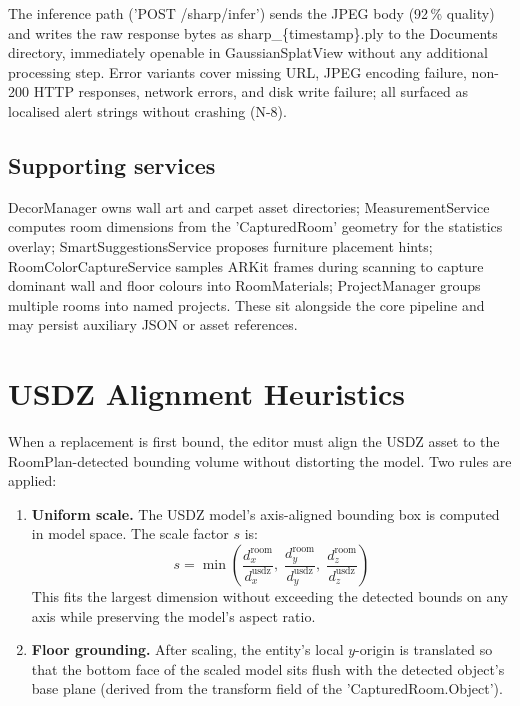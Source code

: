The inference path ('POST /sharp/infer') sends the JPEG body (92\,\% quality) and writes the raw response bytes as sharp\_\{timestamp\}.ply to the Documents directory, immediately openable in GaussianSplatView without any additional processing step. Error variants cover missing URL, JPEG encoding failure, non-200 HTTP responses, network errors, and disk write failure; all surfaced as localised alert strings without crashing (N-8).


\subsection{Supporting services}

DecorManager owns wall art and carpet asset directories; MeasurementService computes room dimensions from the 'CapturedRoom' geometry for the statistics overlay; SmartSuggestionsService proposes furniture placement hints; \\ RoomColorCaptureService samples ARKit frames during scanning to capture dominant wall and floor colours into RoomMaterials; ProjectManager groups multiple rooms into named projects. These sit alongside the core pipeline and may persist auxiliary JSON or asset references.

\section{USDZ Alignment Heuristics}
\label{sec:alignment}

When a replacement is first bound, the editor must align the USDZ asset to the RoomPlan-detected bounding volume without distorting the model. Two rules are applied:

\begin{enumerate}
    \item \textbf{Uniform scale.} The USDZ model's axis-aligned bounding box is computed in model space. The scale factor $s$ is:
    \[
        s = \min\!\left(\frac{d_x^{\mathrm{room}}}{d_x^{\mathrm{usdz}}},\;
                         \frac{d_y^{\mathrm{room}}}{d_y^{\mathrm{usdz}}},\;
                         \frac{d_z^{\mathrm{room}}}{d_z^{\mathrm{usdz}}}\right)
    \]
    This fits the largest dimension without exceeding the detected bounds on any axis while preserving the model's aspect ratio.

    \item \textbf{Floor grounding.} After scaling, the entity's local $y$-origin is translated so that the bottom face of the scaled model sits flush with the detected object's base plane (derived from the transform field of the 'CapturedRoom.Object').
\end{enumerate}

